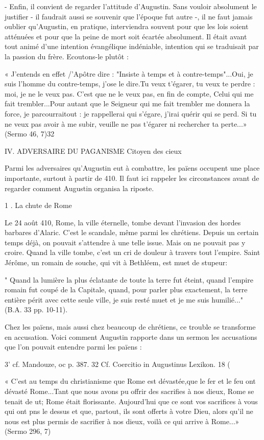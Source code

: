 - Enfin, il convient de regarder l'attitude  d'Augustin. Sans vouloir absolument le justifier - il faudrait aussi se souvenir que l'époque fut autre -, il ne faut jamais oublier qu'Augustin, en pratique, interviendra souvent pour que les lois soient atténuées et pour que la peine de mort soit écartée absolument. Il était avant tout animé d'une intention évangélique indéniable, intention qui se traduisait par la passion du frère. Ecoutons-le plutôt :

« J'entends en effet /'Apôtre dire : "Insiste à temps et à contre-temps"...Oui, je suis l'homme du contre-temps, j'ose le dire.Tu veux t'égarer, tu veux te perdre : moi, je ne le veux pas. C'est que ne le veux pas, en fin de compte, Celui qui me fait trembler...Pour autant que le Seigneur qui me fait trembler me donnera la force, je parcourraitout : je rappellerai qui s'égare, j'irai quérir qui se perd. Si tu ne veux pas avoir à me subir, veuille ne pas t'égarer ni rechercher ta perte...» (Sermo 46, 7)32


IV.	ADVERSAIRE	DU PAGANISME
Citoyen des cieux

Parmi les adversaires qu'Augustin eut à combattre, les païens occupent une place importante, surtout à partir de 410. Il faut ici rappeler les circonstances avant de regarder comment Augustin organisa la riposte.

1 . La	chute de	Rome

Le 24 août 410, Rome, la ville éternelle, tombe devant l'invasion des hordes barbares d'Alaric. C'est le scandale, même parmi les chrétiens. Depuis un certain temps déjà, on pouvait s'attendre à une telle issue. Mais on ne pouvait pas y croire. Quand la ville tombe, c'est un cri de douleur à travers tout l'empire. Saint Jérôme, un romain de souche, qui vit à Bethléem, est muet de stupeur:

" Quand la lumière la plus éclatante de toute la terre fut éteint, quand l'empire romain fut coupé de la Capitale, quand, pour parler plus exactement, la terre entière périt avec cette seule ville, je suis resté muet et je me suis humilié..." (B.A. 33 pp. 10-11).

Chez les païens, mais aussi chez beaucoup de chrétiens, ce trouble se transforme en accusation. Voici comment Augustin rapporte dans un sermon les accusations que l'on pouvait entendre parmi les païens :



3' cf. Mandouze, oc p. 387.
32 Cf. Coercitio in Augustinus Lexikon.
18
(
 
« C'est au temps du christianisme que Rome est dévastée,que le fer et le feu ont dévasté Rome...Tant que nous avons pu offrir des sacrifies à nos dieux, Rome se tenait de ut; Rome était florissante. Aujourd'hui que ce sont vos sacrifices à vous qui ont pns le dessus et que, partout, ils sont offerts à votre Dieu, alors qu'il ne nous est plus permis de sacrifier à nos dieux, voilà ce qui arrive à Rome...» (Sermo 296, 7)

